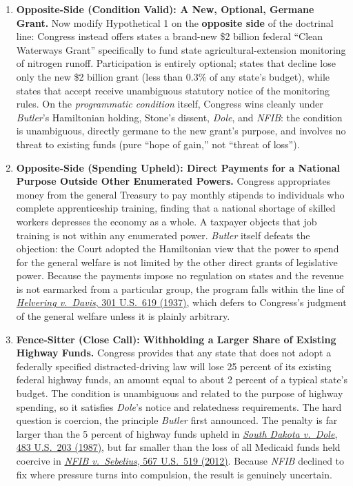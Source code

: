 \documentclass[12pt]{article}
\begin{document}
\begin{enumerate}
\item \textbf{Opposite-Side (Condition Valid): A New, Optional, Germane Grant.} Now modify Hypothetical 1 on the \textbf{opposite side} of the doctrinal line: Congress instead offers states a brand-new \$2 billion federal ``Clean Waterways Grant'' specifically to fund state agricultural-extension monitoring of nitrogen runoff. Participation is entirely optional; states that decline lose only the new \$2 billion grant (less than 0.3\% of any state's budget), while states that accept receive unambiguous statutory notice of the monitoring rules. On the \textit{programmatic condition} itself, Congress wins cleanly under \textit{Butler}'s Hamiltonian holding, Stone's dissent, \textit{Dole}, and \textit{NFIB}: the condition is unambiguous, directly germane to the new grant's purpose, and involves no threat to existing funds (pure ``hope of gain,'' not ``threat of loss'').

\item \textbf{Opposite-Side (Spending Upheld): Direct Payments for a National Purpose Outside Other Enumerated Powers.} Congress appropriates money from the general Treasury to pay monthly stipends to individuals who complete apprenticeship training, finding that a national shortage of skilled workers depresses the economy as a whole. A taxpayer objects that job training is not within any enumerated power. \textit{Butler} itself defeats the objection: the Court adopted the Hamiltonian view that the power to spend for the general welfare is not limited by the other direct grants of legislative power. Because the payments impose no regulation on states and the revenue is not earmarked from a particular group, the program falls within the line of \href{https://supreme.justia.com/cases/federal/us/301/619/}{\textit{Helvering v.\ Davis}, 301 U.S.\ 619 (1937)}, which defers to Congress's judgment of the general welfare unless it is plainly arbitrary.

\item \textbf{Fence-Sitter (Close Call): Withholding a Larger Share of Existing Highway Funds.} Congress provides that any state that does not adopt a federally specified distracted-driving law will lose 25 percent of its existing federal highway funds, an amount equal to about 2 percent of a typical state's budget. The condition is unambiguous and related to the purpose of highway spending, so it satisfies \textit{Dole}'s notice and relatedness requirements. The hard question is coercion, the principle \textit{Butler} first announced. The penalty is far larger than the 5 percent of highway funds upheld in \href{https://supreme.justia.com/cases/federal/us/483/203/}{\textit{South Dakota v.\ Dole}, 483 U.S.\ 203 (1987)}, but far smaller than the loss of all Medicaid funds held coercive in \href{https://supreme.justia.com/cases/federal/us/567/519/}{\textit{NFIB v.\ Sebelius}, 567 U.S.\ 519 (2012)}. Because \textit{NFIB} declined to fix where pressure turns into compulsion, the result is genuinely uncertain.

\end{enumerate}
\end{document}
